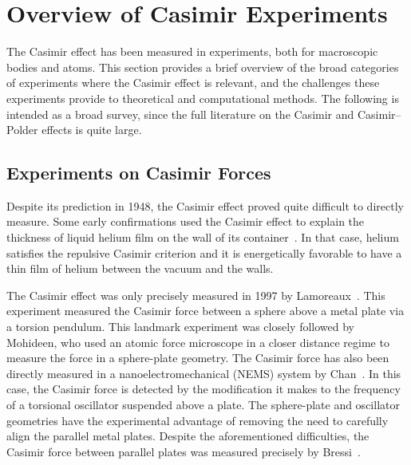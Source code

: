 \section{Overview of Casimir Experiments}
\label{sec:expt_review}

The Casimir effect has been measured in experiments, both for macroscopic bodies and atoms.
This section provides a brief overview of the broad categories of experiments where the Casimir effect is relevant,
and the challenges these experiments provide to theoretical and computational methods.    
The following is intended as a broad survey, since the full literature on the Casimir and Casimir--Polder 
effects is quite large.  

\subsection{Experiments on Casimir Forces}

Despite its prediction in 1948, the Casimir effect proved quite difficult to directly measure.
Some early confirmations used the Casimir effect to explain the thickness of liquid helium film on 
the wall of its container~\cite{Sabisky1973,Dzyaloshinskii1961}.
In that case, helium satisfies the repulsive Casimir criterion and it is energetically favorable
to have a thin film of helium between the vacuum and the walls.  

The Casimir effect was only precisely measured in 1997 by Lamoreaux~\cite{Lamoreaux1997}.   
This experiment measured the Casimir force between a sphere above a metal plate
 via a torsion pendulum.  
This landmark experiment was closely followed by Mohideen\etal\cite{Mohideen1998},
who used an atomic force microscope in a closer distance regime to measure the force in a sphere-plate geometry.  
The Casimir force has also been directly measured in a nanoelectromechanical (NEMS) system 
by Chan\etal~\cite{Chan2001}.  In this case, the Casimir force is detected by the modification it
makes to the frequency of a torsional oscillator suspended above a plate.  
The sphere-plate and oscillator geometries have the experimental advantage of removing the need to carefully
align the parallel metal plates. %
Despite the aforementioned difficulties, the Casimir force between parallel plates was measured precisely by Bressi\etal~\cite{Bressi2002}.  

